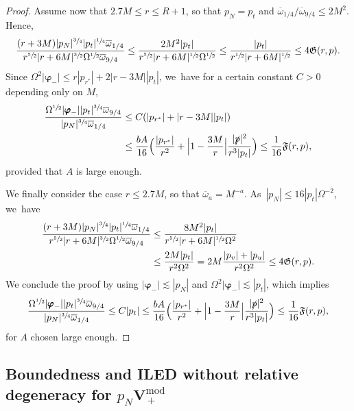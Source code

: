 \documentclass[10pt]{amsart}
\theoremstyle{plain}
\theoremstyle{definition}
\begin{document}
\begin{proof}
Assume now that $2.7M \leq r \leq R+1$, so that $p_N=p_t$ and $\overline{\omega}_{1/4} /\overline{\omega}_{9/4} \leq 2M^2$. Hence,\vspace*{-3pt}
\[
\frac{(r+3M)|p_N|^{\sfrac{3}{4}} |p_t|^{\sfrac{1}{4}}\overline{\omega}_{1/4} }{r^{\sfrac{5}{2}}|r+6M|^{\sfrac{3}{2}}\Omega^{\sfrac{1}{2}} \overline{\omega}_{9/4}} \leq \frac{2M^2 |p_t| }{r^{\sfrac{5}{2}}|r+6M|^{\sfrac{1}{2}}\Omega^{\sfrac{1}{2}} } \leq \frac{|p_t|}{r^{\sfrac{1}{2}}|r+6M|^{\sfrac{1}{2}}} \leq 4 \mathfrak{G}(r,p).
\]
Since $\Omega^2|\pmb{\varphi}_-| \leq r|p_{r^*}|+2|r-3M||p_t|$, we~have for a certain constant $C>0$ depending only on $M$,\vspace*{-3pt}
\begin{align*}
\frac{ \Omega^{\sfrac{1}{2}}|\pmb{\varphi}_-||p_t|^{\sfrac{3}{4}}\overline{\omega}_{9/4}}{ |p_N|^{\sfrac{3}{4}}\overline{\omega}_{1/4}} &\leq C(|p_{r^*}|+|r-3M||p_t|)\\
&\leq \frac{bA}{16} \Bigl(\frac{|p_{r^*}|}{r^2}+ \Bigl |1-\frac{3M}{r} \Bigr| \frac{|\slashed{p}|^2}{r^3 |p_t|} \Bigr) \leq \frac{1}{16} \mathfrak{F}(r,p),
\end{align*}
provided that $A$ is large enough.

We finally consider the case $r \leq 2.7M$, so that $\overline{\omega}_{a}=M^{-a}$. As~$|p_N| \leq 16|p_t|\Omega^{-2}$, we~have\vspace*{-3pt}
\begin{align*}
\frac{(r+3M)|p_N|^{\sfrac{3}{4}} |p_t|^{\sfrac{1}{4}}\overline{\omega}_{1/4} }{r^{\sfrac{5}{2}}|r+6M|^{\sfrac{3}{2}}\Omega^{\sfrac{1}{2}} \overline{\omega}_{9/4}} &\leq \frac{8 M^2|p_t|}{r^{\sfrac{5}{2}}|r+6M|^{\sfrac{1}{2}}\Omega^2}\\
&\leq \frac{2M|p_t|}{r^2\Omega^2} = 2M \frac{|p_v|+|p_u|}{r^2\Omega^2} \leq 4 \mathfrak{G}(r,p).
\end{align*}
We conclude the proof by using $|\pmb{\varphi}_-| \lesssim |p_N|$ and $\Omega^2|\pmb{\varphi}_-|\lesssim |p_t|$, which implies
\[
\frac{ \Omega^{\sfrac{1}{2}}|\pmb{\varphi}_-||p_t|^{\sfrac{3}{4}}\overline{\omega}_{9/4}}{ |p_N|^{\sfrac{3}{4}}\overline{\omega}_{1/4}} \leq C |p_t| \leq \frac{bA}{16} \Bigl(\frac{|p_{r^*}|}{r^2}+ \Bigl |1-\frac{3M}{r} \Bigr | \frac{|\slashed{p}|^2}{r^3 |p_t|} \Bigr) \leq \frac{1}{16} \mathfrak{F}(r,p),
\]
for $A$ chosen large enough.
\end{proof}

\subsection{Boundedness and ILED without relative degeneracy for $p_N \pmb{V}_{\, +}^{\mathrm{mod}}$}\label{Subsec74}
\end{document}

